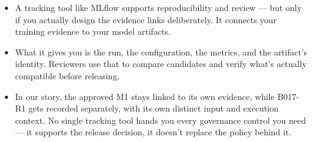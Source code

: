 \documentclass[11pt,a4paper]{article}
\begin{document}
\begin{examplebox}[title after break={SPOKEN SCRIPT --- slide 51 continued}]
\begin{itemize}
\item A tracking tool like MLflow supports reproducibility and review — but only if you actually design the evidence links deliberately. It connects your training evidence to your model artifacts.
\item What it gives you is the run, the configuration, the metrics, and the artifact's identity. Reviewers use that to compare candidates and verify what's actually compatible before releasing.
\item In our story, the approved M1 stays linked to its own evidence, while B017-R1 gets recorded separately, with its own distinct input and execution context. No single tracking tool hands you every governance control you need — it supports the release decision, it doesn't replace the policy behind it.
\end{itemize}
\end{examplebox}
\par\noindent{\scriptsize\textcolor{teal!60!black}{Reading anchor: Bass, Ch. 14 · Illustrative MLflow role}}
\clearpage
\end{document}
